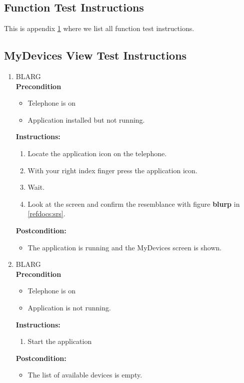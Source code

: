 \documentclass[a4paper]{article}
\newlength{\testlabellength}
\newenvironment{testlist}{\begin{enumerate}[label=\bfseries Instruction \thesubsection.\arabic* , labelindent=0pt, labelwidth=\testlabellength , leftmargin=2cm]}{\end{enumerate}}
\newenvironment{precondition}{
{\color{white}BLARG}\\ 
\textbf{Precondition}
\begin{itemize}[labelindent=0cm, labelwidth=2cm , leftmargin=1cm]
}
{\end{itemize}}
\newenvironment{instruction}{
\textbf{Instructions:}
\begin{enumerate}[label=\bfseries  \arabic*., labelindent=0cm, labelwidth=2cm , leftmargin=1cm]
}
{\end{enumerate}}
\newenvironment{postcondition}{
\textbf{Postcondition:}
\begin{itemize}[labelindent=0cm, labelwidth=2cm , leftmargin=1cm]
}
{\end{itemize}}
\begin{document}
\newpage
\begin{appendices}

\section{Function Test Instructions} \label{appendix:section:functiontest}
This is appendix \ref{appendix:section:functiontest} where we list all function test instructions.

\subsection{MyDevices View Test Instructions}
\begin{testlist}

    \item 
    	\begin{precondition}
    		\item Telephone is on
    		\item Application installed but not running.
    	\end{precondition}
    	\begin{instruction}
    		\item Locate the application icon on the telephone.
    		\item With your right index finger press the application icon.
	    	\item Wait.
    		\item Look at the screen and confirm the resemblance with figure \textbf{blurp} in \ref{refdocs:srs}.
    	\end{instruction}
    	\begin{postcondition}
    		\item The application is running and the MyDevices screen is shown.
    	\end{postcondition}
    
	\item
		\begin{precondition}
			\item Telephone is on
			\item Application is not running.
    	\end{precondition}
    	\begin{instruction}
    		\item Start the application
    	\end{instruction}
    	\begin{postcondition}
    		\item The list of available devices is empty.
    	\end{postcondition}
    

\end{testlist}
\end{appendices}
\end{document}

